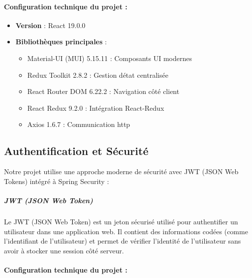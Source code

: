 \documentclass[12pt,a4paper,twoside]{report}
\begin{document}
\hypertarget{configuration-technique-du-projet-1}{%
\paragraph{\texorpdfstring{\textbf{Configuration technique du projet
:}}{Configuration technique du projet :}}\label{configuration-technique-du-projet-1}}

\begin{itemize}
\item
  \textbf{Version} : React 19.0.0
\item
  \textbf{Bibliothèques principales} :

  \begin{itemize}
  \item
    Material-UI (MUI) 5.15.11 : Composants UI modernes
  \item
    Redux Toolkit 2.8.2 : Gestion d\textquotesingle état centralisée
  \item
    React Router DOM 6.22.2 : Navigation côté client
  \item
    React Redux 9.2.0 : Intégration React-Redux
  \item
    Axios 1.6.7 : Communication http
  \end{itemize}
\end{itemize}

\hypertarget{authentification-et-suxe9curituxe9}{%
\subsection{Authentification et
Sécurité}\label{authentification-et-suxe9curituxe9}}

Notre projet utilise une approche moderne de sécurité avec JWT (JSON Web
Tokens) intégré à Spring Security :

\hypertarget{jwt-json-web-token}{%
\subparagraph{\texorpdfstring{\textbf{JWT} \textbf{(JSON Web
Token)}}{JWT (JSON Web Token)}}\label{jwt-json-web-token}}

Le JWT (JSON Web Token) est un jeton sécurisé utilisé pour authentifier
un utilisateur dans une application web. Il contient des informations
codées (comme l'identifiant de l'utilisateur) et permet de vérifier
l'identité de l'utilisateur sans avoir à stocker une session côté
serveur.

\hypertarget{configuration-technique-du-projet-2}{%
\paragraph{\texorpdfstring{\textbf{Configuration technique du projet
:}}{Configuration technique du projet :}}\label{configuration-technique-du-projet-2}}
\end{document}
